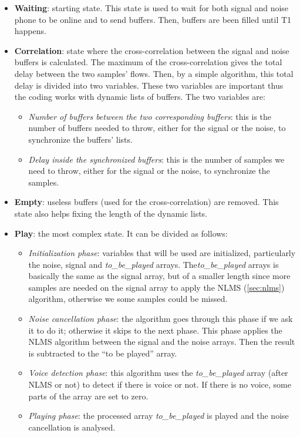 \documentclass[11pt,a4paper,english]{book}  %
\theoremstyle{definition}  %
\theoremstyle{plain}  %
\theoremstyle{remark}  %
\begin{document}
	\begin{itemize}
	\item \textbf{Waiting}: starting state. This state is used to wait for both signal and noise phone to be online and to send buffers. Then, buffers are been filled until T1 happens.
	
	\item \textbf{Correlation}: state where the cross-correlation between the signal and noise buffers is calculated. The maximum of the cross-correlation gives the total delay between the two samples’ flows. Then, by a simple algorithm, this total delay is divided into two variables. These two variables are important thus the coding works with dynamic lists of buffers. The two variables are:
	
		\begin{itemize}
		\item \textit{Number of buffers between the two corresponding buffers}: this is the number of buffers needed to throw, either for the signal or the noise, to synchronize the buffers' lists.
		\item  \textit{Delay inside the synchronized buffers}: this is the number of samples we need to throw, either for the signal or the noise, to synchronize the samples.
		\end{itemize}
		
	\item \textbf{Empty}: useless buffers (used for the cross-correlation) are removed. This state also helps fixing the length of the dynamic lists.
	
	\item \textbf{Play}: the most complex state. It can be divided as follows:
	
		\begin{itemize}
		\item \textit{Initialization phase}: variables that will be used are initialized, particularly the noise, signal and \textit{to\_be\_played} arrays. The\textit{to\_be\_played} arrays is basically the same as the signal array,  but of a smaller length since more samples are needed on the signal array to apply the NLMS (\ref{sec:nlms}) algorithm, otherwise we some samples could be missed.
		
		\item \textit{Noise cancellation phase}: the algorithm goes through this phase if we ask it to do it; otherwise it skips to the next phase. This phase applies the NLMS algorithm between the signal and the noise arrays. Then the result is subtracted to the “to be played” array.
		
		\item \textit{Voice detection phase}: this algorithm uses the \textit{to\_be\_played} array (after NLMS or not) to detect if there is voice or not. If there is no voice, some parts of the array are set to zero.
		\item \textit{Playing phase}: the processed array \textit{to\_be\_played} is played and the noise cancellation is analysed.
		\end{itemize}
		
		
	\end{itemize}
		
\end{document}
